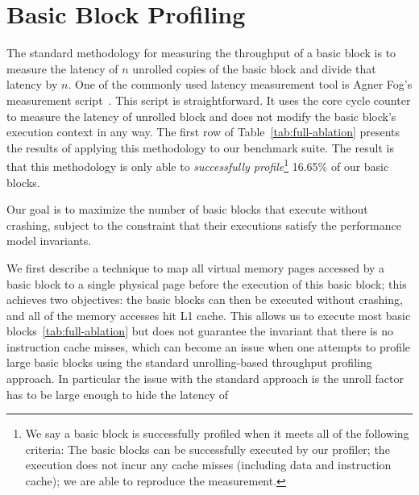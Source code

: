 \section{Basic Block Profiling}
The standard methodology for measuring the throughput of a basic block
is to measure the latency of $n$ unrolled copies of the basic block
and divide that latency by $n$.
One of the commonly used latency measurement tool is Agner Fog's measurement script~\cite{agner}.
This script is straightforward. 
It uses the core cycle counter to measure the latency of unrolled block and
does not modify the basic block's execution context in any way.
The first row of Table~\ref{tab:full-ablation} presents the results of applying
this methodology to our benchmark suite. 
The result is that this methodology is only able to {\em successfully profile}\footnote{
We say a basic block is successfully profiled when it meets all of the following criteria:
The basic blocks can be successfully executed by our profiler;
the execution does not incur any cache misses (including data and instruction cache);
we are able to reproduce the measurement.
} 16.65\% of our basic blocks.


Our goal is to maximize the number of basic blocks that execute without crashing, subject to the constraint that their executions satisfy the performance model invariants.

We first describe a technique to map all virtual memory pages accessed by a basic block
to a single physical page before the execution of this basic block;
this achieves two objectives: the basic blocks can then be executed without crashing,
and all of the memory accesses hit L1 cache.
This allows us to execute most basic blocks~\ref{tab:full-ablation}
but does not guarantee the invariant that there is no instruction cache misses,
which can become an issue when one attempts to profile large basic blocks using
the standard unrolling-based throughput profiling approach.
In particular the issue with the standard approach is the unroll factor
has to be large enough to hide the latency of 



